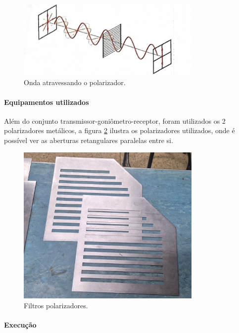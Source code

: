 \documentclass[12pt]{article}
\begin{document}
\begin{figure}[H]
  \centering
  \includegraphics[width=0.8\textwidth]{img/polarizacao-onda-polarizada.png}
  \caption{Onda atravessando o polarizador.}
  \label{fig:img/polarizacao-onda-polarizada.png}
\end{figure}

\paragraph{Equipamentos utilizados}
Além do conjunto transmissor-goniômetro-receptor, foram utilizados os
2 polarizadores metálicos, a figura
\ref{fig:img/polarizacao-filtros.png} ilustra os polarizadores
utilizados, onde é possível ver as aberturas retangulares
paralelas entre si.

\begin{figure}[H]
  \centering
  \includegraphics[width=0.8\textwidth]{img/polarizacao-filtros.png}
  \caption{Filtros polarizadores.}
  \label{fig:img/polarizacao-filtros.png}
\end{figure}
\paragraph{Execução}
\end{document}
